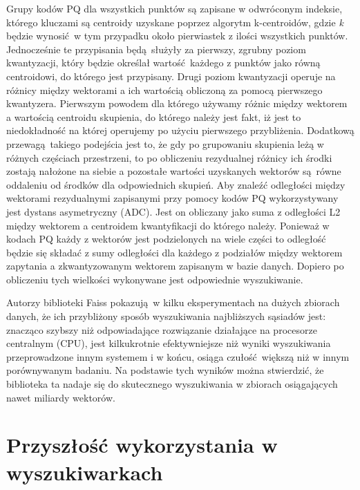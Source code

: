 Grupy kodów PQ dla wszystkich punktów są zapisane w odwróconym indeksie, którego kluczami są centroidy uzyskane poprzez algorytm k-centroidów, gdzie \emph{k} będzie wynosić w tym przypadku około pierwiastek z ilości wszystkich punktów. \autocite{raffel2020exploring} Jednocześnie te przypisania będą służyły za pierwszy, zgrubny poziom kwantyzacji, który będzie określał wartość każdego z punktów jako równą centroidowi, do którego jest przypisany. Drugi poziom kwantyzacji operuje na różnicy między wektorami a ich wartością obliczoną za pomocą pierwszego kwantyzera. Pierwszym powodem dla którego używamy różnic między wektorem a wartością centroidu skupienia, do którego należy jest fakt, iż jest to niedokładność na której operujemy po użyciu pierwszego przybliżenia. Dodatkową przewagą takiego podejścia jest to, że gdy po grupowaniu skupienia leżą w różnych częściach przestrzeni, to po obliczeniu rezydualnej różnicy ich środki zostają nałożone na siebie a pozostałe wartości uzyskanych wektorów są równe oddaleniu od środków dla odpowiednich skupień. \autocite{similaritysearch} Aby znaleźć odległości między wektorami rezydualnymi zapisanymi przy pomocy kodów PQ wykorzystywany jest dystans asymetryczny (ADC). Jest on obliczany jako suma z odległości L2 między wektorem a centroidem kwantyfikacji do którego należy. Ponieważ w kodach PQ każdy z wektorów jest podzielonych na wiele części to odległość będzie się składać z sumy odległości dla każdego z podziałów między wektorem zapytania a zkwantyzowanym wektorem zapisanym w bazie danych. Dopiero po obliczeniu tych wielkości wykonywane jest odpowiednie wyszukiwanie. \autocite{similaritysearch} \autocite{productquantaization} \newline

Autorzy biblioteki Faiss pokazują w kilku eksperymentach na dużych zbiorach danych, że ich przybliżony sposób wyszukiwania najbliższych sąsiadów jest: znacząco szybszy niż odpowiadające rozwiązanie działające na procesorze centralnym (CPU), jest kilkukrotnie efektywniejsze niż wyniki wyszukiwania przeprowadzone innym systemem i w końcu, osiąga czułość większą niż w innym porównywanym badaniu. \autocite{raffel2020exploring} Na podstawie tych wyników można stwierdzić, że biblioteka ta nadaje się do skutecznego wyszukiwania w zbiorach osiągających nawet miliardy wektorów.

\section{Przyszłość wykorzystania w wyszukiwarkach}

